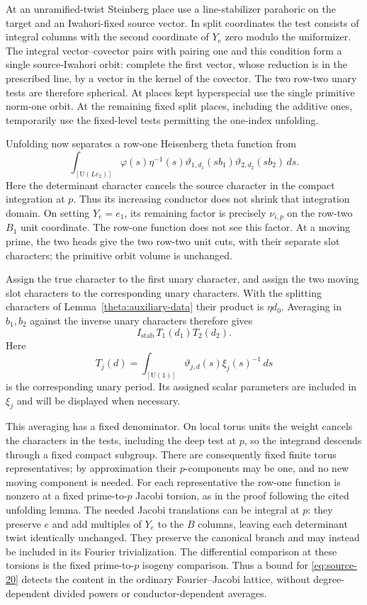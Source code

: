 At an unramified-twist Steinberg place use a line-stabilizer
parahoric on the target and an Iwahori-fixed source vector.  In
split coordinates the test consists of integral columns with the
second coordinate of $Y_e$ zero modulo the uniformizer.  The
integral vector--covector pairs with pairing one and this condition
form a single source-Iwahori orbit: complete the first vector,
whose reduction is in the prescribed line, by a vector in the
kernel of the covector.  The two row-two unary tests are therefore
spherical.  At places kept hyperspecial use the single primitive
norm-one orbit.  At the remaining fixed split places, including
the additive ones, temporarily use the fixed-level tests permitting
the one-index unfolding.

Unfolding now separates a row-one Heisenberg theta function from
\[
 \int_{[\mathrm U(Le_2)]}\varphi(s)\eta^{-1}(s)
            \vartheta_{1,d_1}(sb_1)\vartheta_{2,d_2}(sb_2)\,ds.
\]
Here the determinant character cancels the source character in the
compact integration at $p$.  Thus its increasing conductor does not
shrink that integration domain.  On setting $Y_e=e_1$, its remaining
factor is precisely $\nu_{i,p}$ on the row-two $B_1$ unit coordinate.
The row-one function does not see this factor.  At a moving prime,
the two heads give the two row-two unit cuts, with their separate
slot characters; the primitive orbit volume is unchanged.

Assign the true character to the first unary character, and assign
the two moving slot characters to the corresponding unary
characters.  With the splitting characters of
Lemma~\ref{theta:auxiliary-data} their product is $\eta d_0$.
Averaging in $b_1,b_2$ against the inverse unary characters therefore
gives
\begin{equation}
                   I_{\mathrm{stab}}\,T_1(d_1)T_2(d_2).
\tag{20}\label{eq:source-20}
\end{equation}
Here
\[
 T_j(d)=\int_{[\mathrm U(1)]}\vartheta_{j,d}(s)\xi_j(s)^{-1}\,ds
\]
is the corresponding unary period.  Its assigned scalar parameters
are included in $\xi_j$ and will be displayed when necessary.

This averaging has a fixed denominator.  On local torus units the
weight cancels the characters in the tests, including the deep test
at $p$, so the integrand descends through a fixed compact subgroup.
There are consequently fixed finite torus representatives; by
approximation their $p$-components may be one, and no new moving
component is needed.  For each representative the row-one function
is nonzero at a fixed prime-to-$p$ Jacobi torsion, as in the proof
following the cited unfolding lemma.  The needed Jacobi translations
can be integral at $p$: they preserve $e$ and add multiples of $Y_e$
to the $B$ columns, leaving each determinant twist identically
unchanged.  They preserve the canonical branch and may instead be
included in its Fourier trivialization.  The differential comparison
at these torsions is the fixed prime-to-$p$ isogeny comparison.
Thus a bound for \eqref{eq:source-20} detects the content in the
ordinary Fourier--Jacobi lattice, without degree-dependent divided
powers or conductor-dependent averages.

